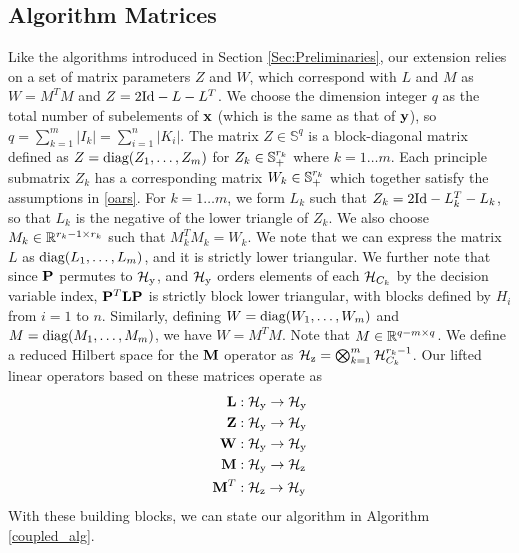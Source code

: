 \subsection{Algorithm Matrices}
Like the algorithms introduced in Section \ref{Sec:Preliminaries}, our extension relies on a set of matrix parameters $Z$ and $W$, which correspond with $L$ and $M$ as $W = M^T M$ and $Z = 2\mathrm{Id} - L - L^T$.
We choose the dimension integer $q$ as the total number of subelements of $\mathbf{x}$ (which is the same as that of $\mathbf{y}$), so $q = \sum_{k=1}^m |I_k| = \sum_{i=1}^n |K_i|$.
The matrix $Z \in \mathbb{S}^q$ is a block-diagonal matrix defined as $Z = \text{diag}{\left(Z_1, \dots, Z_m\right)}$ for $Z_k \in \mathbb{S}_+^{r_k}$ where $k=1 \dots m$.
Each principle submatrix $Z_k$ has a corresponding matrix $W_k \in \mathbb{S}_+^{r_k}$ which together satisfy the assumptions in \eqref{oars}.
For $k=1 \dots m$, we form $L_k$ such that $Z_k = 2\mathrm{Id} - L_k^T - L_k$, so that $L_k$ is the negative of the lower triangle of $Z_k$.
We also choose $M_k \in \mathbb R^{r_k - 1 \times r_k}$ such that $ M_k^T M_k = W_k$.
We note that we can express the matrix $L$ as $\text{diag}{\left(L_1, \dots, L_m\right)}$, and it is strictly lower triangular.
We further note that since $\mathbf{P}$ permutes to $\mathcal{H}_\text{y}$, and $\mathcal{H}_\text{y}$ orders elements of each $\mathcal{H}_{C_k}$ by the decision variable index, $\mathbf{P}^T \mathbf{L} \mathbf{P}$ is strictly block lower triangular, with blocks defined by $H_i$ from $i=1$ to $n$.
Similarly, defining $W = \text{diag}{\left(W_1, \dots, W_m\right)}$ and $M = \text{diag}{\left(M_1, \dots, M_m\right)}$, we have $W=M^T M$.
Note that $M \in \mathbb R^{q-m \times q}$.
We define a reduced Hilbert space for the $\mathbf{M}$ operator as $\mathcal{H}_\text{z} = \bigotimes_{k=1}^m \mathcal{H}_{C_k}^{r_k-1}$.
Our lifted linear operators based on these matrices operate as
\begin{align}
    \mathbf{L} &: \mathcal{H}_\text{y} \to \mathcal{H}_\text{y} \\
    \mathbf{Z} &: \mathcal{H}_\text{y} \to \mathcal{H}_\text{y} \\
    \mathbf{W} &: \mathcal{H}_\text{y} \to \mathcal{H}_\text{y} \\
    \mathbf{M} &: \mathcal{H}_\text{y} \to \mathcal{H}_\text{z} \\
    \mathbf{M}^T &: \mathcal{H}_\text{z} \to \mathcal{H}_\text{y} 
\end{align}
With these building blocks, we can state our algorithm in Algorithm \ref{coupled_alg}.

